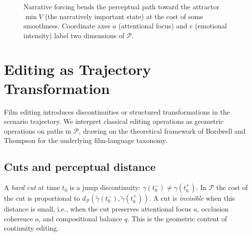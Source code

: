 \documentclass[12pt,a4paper]{article}
\theoremstyle{plain}
\theoremstyle{definition}
\begin{document}
\begin{figure}[h]
\centering
{}
\caption{Narrative forcing bends the perceptual path toward the attractor
$\min V$ (the narratively important state) at the cost of some smoothness.
Coordinate axes $a$ (attentional focus) and $e$ (emotional intensity) label
two dimensions of $\mathcal{P}$.}
\label{fig:forcing}
\end{figure}

\section{Editing as Trajectory Transformation}
\label{sec:editing}

Film editing introduces discontinuities or structured transformations in
the scenario trajectory. We interpret classical editing operations as geometric
operations on paths in $\mathcal{P}$, drawing on the theoretical framework of
Bordwell and Thompson \cite{bordwell2010} for the underlying film-language
taxonomy.

\subsection{Cuts and perceptual distance}

A \emph{hard cut} at time $t_0$ is a jump discontinuity:
$\gamma(t_0^-) \neq \gamma(t_0^+)$.
In $\mathcal{P}$ the cost of the cut is proportional to
$d_\mathcal{P}(\tilde\gamma(t_0^-), \tilde\gamma(t_0^+))$.
A cut is \emph{invisible} when this distance is small, i.e., when the cut
preserves attentional focus $a$, occlusion coherence $o$, and compositional
balance $q$. This is the geometric content of continuity editing.
\end{document}

